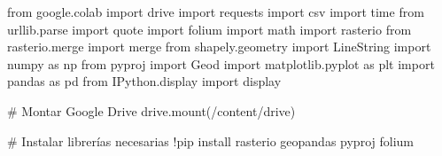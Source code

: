 \documentclass[
  letterpaper,
  DIV=11,
  numbers=noendperiod]{scrreprt}
\newenvironment{Shaded}{\begin{snugshade}}{\end{snugshade}}
\newcommand{\CommentTok}[1]{\textcolor[rgb]{0.37,0.37,0.37}{#1}}
\newcommand{\ImportTok}[1]{\textcolor[rgb]{0.00,0.46,0.62}{#1}}
\newcommand{\NormalTok}[1]{\textcolor[rgb]{0.00,0.23,0.31}{#1}}
\newcommand{\OperatorTok}[1]{\textcolor[rgb]{0.37,0.37,0.37}{#1}}
\newcommand{\StringTok}[1]{\textcolor[rgb]{0.13,0.47,0.30}{#1}}
\begin{document}
\begin{Shaded}
\begin{Highlighting}[]
\ImportTok{from}\NormalTok{ google.colab }\ImportTok{import}\NormalTok{ drive}
\ImportTok{import}\NormalTok{ requests}
\ImportTok{import}\NormalTok{ csv}
\ImportTok{import}\NormalTok{ time}
\ImportTok{from}\NormalTok{ urllib.parse }\ImportTok{import}\NormalTok{ quote}
\ImportTok{import}\NormalTok{ folium}
\ImportTok{import}\NormalTok{ math}
\ImportTok{import}\NormalTok{ rasterio}
\ImportTok{from}\NormalTok{ rasterio.merge }\ImportTok{import}\NormalTok{ merge}
\ImportTok{from}\NormalTok{ shapely.geometry }\ImportTok{import}\NormalTok{ LineString}
\ImportTok{import}\NormalTok{ numpy }\ImportTok{as}\NormalTok{ np}
\ImportTok{from}\NormalTok{ pyproj }\ImportTok{import}\NormalTok{ Geod}
\ImportTok{import}\NormalTok{ matplotlib.pyplot }\ImportTok{as}\NormalTok{ plt}
\ImportTok{import}\NormalTok{ pandas }\ImportTok{as}\NormalTok{ pd}
\ImportTok{from}\NormalTok{ IPython.display }\ImportTok{import}\NormalTok{ display}

\CommentTok{\# Montar Google Drive}
\NormalTok{drive.mount(}\StringTok{\textquotesingle{}/content/drive\textquotesingle{}}\NormalTok{)}

\CommentTok{\# Instalar librerías necesarias}
\OperatorTok{!}\NormalTok{pip install rasterio geopandas pyproj folium}


\end{Highlighting}
\end{Shaded}
\end{document}
